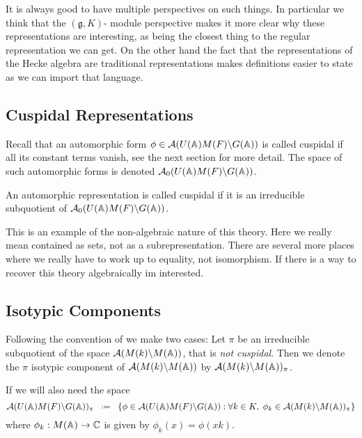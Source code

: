 It is always good to have multiple perspectives on such things. In particular we think that the \((\mathfrak{g}, K)\)- module perspective makes it more clear why these representations are interesting, as being the closest thing to the regular representation we can get. On the other hand the fact that the representations of the Hecke algebra are traditional representations makes definitions easier to state as we can import that language.

\subsection{Cuspidal Representations}
Recall that an automorphic form \(\phi\in \mathcal{A}(U(\A)M(F) \backslash G(\A))\) is called cuspidal  if all its constant terms vanish, see the next section for more detail.
The space of such automorphic forms is denoted \(\mathcal{A}_0(U(\A)M(F) \backslash G(\A))\). 

An automorphic representation is called cuspidal if it is an irreducible subquotient of \(\mathcal{A}_0(U(\A)M(F) \backslash G(\A))\).

\begin{Remark}
    This is an example of the non-algebraic nature of this theory. Here we really mean contained as sets, not as a subrepresentation. There are several more places where we really have to work up to equality, not isomorphism. If there is a way to recover this theory algebraically im interested.
\end{Remark}

\subsection{Isotypic Components}
Following the convention of \cite[II.1]{moeglinSpectralDecompositionEisenstein1995} we make two cases:
Let \(\pi\) be an irreducible subquotient of the space \(\mathcal{A}(M(k) \backslash M(\A))\), that is \textit{not cuspidal}. Then we denote the \(\pi\) isotypic component of \(\mathcal{A}(M(k) \backslash M(\A))\) by \(\mathcal{A}(M(k) \backslash M(\A))_\pi\).

If we will also need the space 
\[\mathcal{A}(U(\A)M(F) \backslash G(\A))_\pi \defeq \{\phi \in \mathcal{A}(U(\A)M(F) \backslash G(\A)) : \forall k\in K, \; \phi_k\in\mathcal{A}(M(k) \backslash M(\A))_\pi \}\]
where \(\phi_k: M(\A) \to \C\) is given by \(\phi_k(x) = \phi(xk)\).

